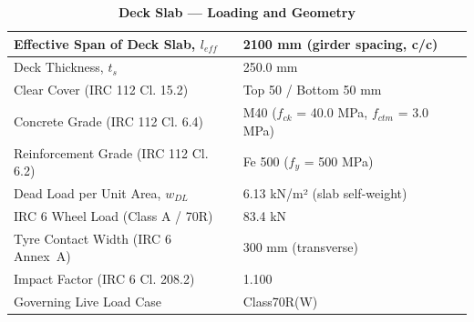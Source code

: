\documentclass[12pt,a4paper]{report}
\numberwithin{table}{chapter}
\numberwithin{figure}{chapter}
\begin{document}
\vspace{1em}
\begin{longtable}{|L{5.5cm}|p{10.0cm}|}
\caption{\textbf{Deck Slab --- Loading and Geometry}}
\hline
\textnormal{Effective Span of Deck Slab, $l_{eff}$} & 2100 mm (girder spacing, c/c) \\[6pt]
\hline
\textnormal{Deck Thickness, $t_s$} & 250.0 mm \\[6pt]
\hline
\textnormal{Clear Cover (IRC 112 Cl. 15.2)} & Top 50 / Bottom 50 mm \\[6pt]
\hline
\textnormal{Concrete Grade (IRC 112 Cl. 6.4)} & M40 ($f_{ck}$ = 40.0 MPa, $f_{ctm}$ = 3.0 MPa) \\[6pt]
\hline
\textnormal{Reinforcement Grade (IRC 112 Cl. 6.2)} & Fe 500 ($f_y$ = 500 MPa) \\[6pt]
\hline
\textnormal{Dead Load per Unit Area, $w_{DL}$} & 6.13 kN/m² (slab self-weight) \\[6pt]
\hline
\textnormal{IRC 6 Wheel Load (Class A / 70R)} & 83.4 kN \\[6pt]
\hline
\textnormal{Tyre Contact Width (IRC 6 Annex~A)} & 300 mm (transverse) \\[6pt]
\hline
\textnormal{Impact Factor (IRC 6 Cl. 208.2)} & 1.100 \\[6pt]
\hline
\textnormal{Governing Live Load Case} & Class70R(W) \\[6pt]
\hline
\end{longtable}
\end{document}
